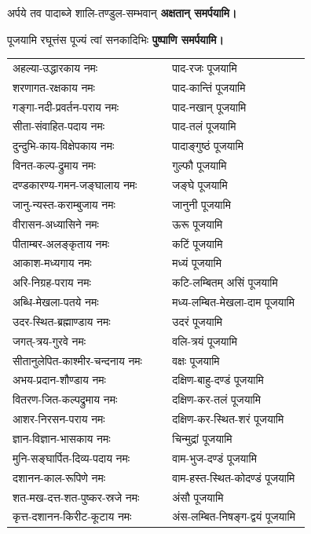 \begin{center}
{अर्पये तव पादाब्जे शालि-तण्डुल-सम्भवान्}
\textbf{\devAya{} अक्षतान् समर्पयामि।\\}

{पूजयामि रघूत्तंस पूज्यं त्वां सनकादिभिः}
\textbf{\devAya{} पुष्पाणि समर्पयामि।}

\begin{supertabular}{p{0.525\linewidth}p{0.45\linewidth}}
अहल्या-उद्धारकाय नमः & पाद-रजः पूजयामि\\
शरणागत-रक्षकाय नमः & पाद-कान्तिं पूजयामि\\
गङ्गा-नदी-प्रवर्तन-पराय नमः & पाद-नखान् पूजयामि\\
सीता-संवाहित-पदाय नमः & पाद-तलं पूजयामि\\
दुन्दुभि-काय-विक्षेपकाय नमः & पादाङ्गुष्ठं पूजयामि\\
विनत-कल्प-द्रुमाय नमः & गुल्फौ पूजयामि\\
दण्डकारण्य-गमन-जङ्घालाय नमः & जङ्घे पूजयामि\\
जानु-न्यस्त-कराम्बुजाय नमः & जानुनी पूजयामि\\
वीरासन-अध्यासिने नमः & ऊरू पूजयामि\\
पीताम्बर-अलङ्कृताय नमः & कटिं पूजयामि\\
आकाश-मध्यगाय नमः & मध्यं पूजयामि\\
अरि-निग्रह-पराय नमः & कटि-लम्बितम् असिं पूजयामि\\
अब्धि-मेखला-पतये नमः & मध्य-लम्बित-मेखला-दाम पूजयामि\\
उदर-स्थित-ब्रह्माण्डाय नमः & उदरं पूजयामि\\
जगत्-त्रय-गुरवे नमः & वलि-त्रयं पूजयामि\\
सीतानुलेपित-काश्मीर-चन्दनाय नमः & वक्षः पूजयामि\\
अभय-प्रदान-शौण्डाय नमः & दक्षिण-बाहु-दण्डं पूजयामि\\
वितरण-जित-कल्पद्रुमाय नमः & दक्षिण-कर-तलं पूजयामि\\
आशर-निरसन-पराय नमः & दक्षिण-कर-स्थित-शरं पूजयामि\\
ज्ञान-विज्ञान-भासकाय नमः & चिन्मुद्रां पूजयामि\\
मुनि-सङ्घार्पित-दिव्य-पदाय नमः & वाम-भुज-दण्डं पूजयामि\\
दशानन-काल-रूपिणे नमः & वाम-हस्त-स्थित-कोदण्डं पूजयामि\\
शत-मख-दत्त-शत-पुष्कर-स्रजे नमः & अंसौ पूजयामि\\
कृत्त-दशानन-किरीट-कूटाय नमः & अंस-लम्बित-निषङ्ग-द्वयं पूजयामि\\

\end{supertabular}
\end{center}
